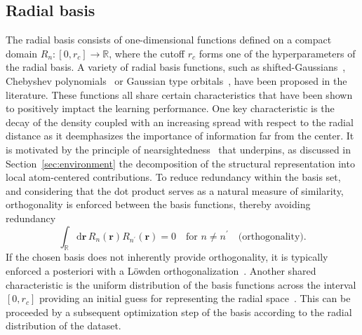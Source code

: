 \subsection{Radial basis}
\label{sec:radial_basis_set}
The radial basis consists of one-dimensional functions defined on a compact domain $R_n:[0, r_c]\rightarrow\mathbb{R}$, where the cutoff $r_c$ forms one of the hyperparameters of the radial basis.
A variety of radial basis functions, such as shifted-Gaussians~\cite{bart+13prb}, Chebyshev polynomials~\cite{shapeev2016moment,drautz2019atomic} or Gaussian type orbitals~\cite{musil2021efficient}, have been proposed in the literature.
These functions all share certain characteristics that have been shown to positively imptact the learning performance. 
One key characteristic is the decay of the density   
 coupled with an increasing spread with respect to the radial distance as it deemphasizes the importance of information far from the center.
 It is motivated by the principle of nearsightedness~\cite{prodan2005nearsightedness} that underpins, as discussed in Section~\ref{sec:environment} the decomposition of the structural representation into local atom-centered contributions.
To reduce redundancy within the basis set, and considering that the dot product serves as a natural measure of similarity, orthogonality is enforced between the basis functions, thereby avoiding redundancy
\begin{equation}
  \int_\mathbb{R}\mathrm{d}\mathbf{r}\,R_n(\mathbf{r})R_{n^\prime}(\mathbf{r}) = 0\quad\textrm{for }n\neq n^\prime\quad \text{(orthogonality)}.
\end{equation}
If the chosen basis does not inherently provide orthogonality, it is typically enforced a posteriori %
with a Löwden orthogonalization~\cite{PIELA2014e99}.
Another shared characteristic is the uniform distribution of the basis functions across the interval $[0, r_c]$ providing an initial guess for representing the radial space~\cite{schutt2018schnet,musil2021efficient,dusson2022atomic}.
This can be proceeded by a subsequent optimization step of the basis according to the radial distribution of the dataset.
